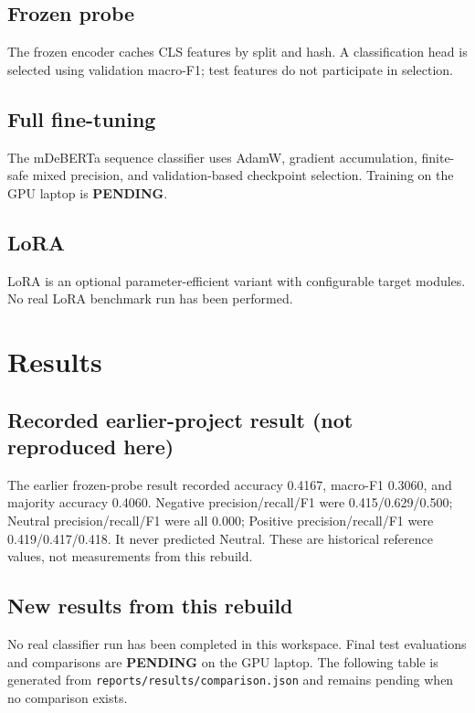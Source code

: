 \documentclass[conference]{IEEEtran}
\begin{document}
\subsection{Frozen probe}
The frozen encoder caches CLS features by split and hash. A classification head is selected
using validation macro-F1; test features do not participate in selection.
\subsection{Full fine-tuning}
The mDeBERTa sequence classifier uses AdamW, gradient accumulation, finite-safe mixed precision,
and validation-based checkpoint selection. Training on the GPU laptop is \textbf{PENDING}.
\subsection{LoRA}
LoRA is an optional parameter-efficient variant with configurable target modules. No real LoRA
benchmark run has been performed.

\section{Results}
\subsection{Recorded earlier-project result (not reproduced here)}
The earlier frozen-probe result recorded accuracy 0.4167, macro-F1 0.3060, and majority
accuracy 0.4060. Negative precision/recall/F1 were 0.415/0.629/0.500; Neutral
precision/recall/F1 were all 0.000; Positive precision/recall/F1 were
0.419/0.417/0.418. It never predicted Neutral. These are historical reference values,
not measurements from this rebuild.

\subsection{New results from this rebuild}
No real classifier run has been completed in this workspace. Final test evaluations and
comparisons are \textbf{PENDING} on the GPU laptop. The following table is generated from
\texttt{reports/results/comparison.json} and remains pending when no comparison exists.

\begin{table}[ht]
\centering
\caption{New rebuild evaluations; pending until real runs are returned.}

\end{table}
\end{document}
